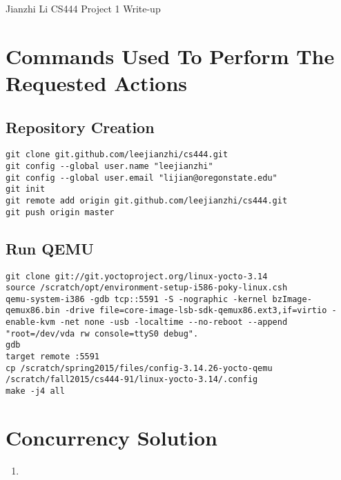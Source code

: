 \documentclass[letterpaper,11pt,titlepage]{article}
\begin{document}
Jianzhi Li\newline
CS444 Project 1 Write-up

\section{Commands Used To Perform The Requested Actions}


\subsection{Repository Creation}

\begin{lstlisting}
git clone git.github.com/leejianzhi/cs444.git
git config --global user.name "leejianzhi"
git config --global user.email "lijian@oregonstate.edu"
git init
git remote add origin git.github.com/leejianzhi/cs444.git
git push origin master
\end{lstlisting}


\subsection{Run QEMU}

\begin{lstlisting}
git clone git://git.yoctoproject.org/linux-yocto-3.14
source /scratch/opt/environment-setup-i586-poky-linux.csh
qemu-system-i386 -gdb tcp::5591 -S -nographic -kernel bzImage-qemux86.bin -drive file=core-image-lsb-sdk-qemux86.ext3,if=virtio -enable-kvm -net none -usb -localtime --no-reboot --append "root=/dev/vda rw console=ttyS0 debug".
gdb
target remote :5591
cp /scratch/spring2015/files/config-3.14.26-yocto-qemu /scratch/fall2015/cs444-91/linux-yocto-3.14/.config
make -j4 all
\end{lstlisting}

\section{Concurrency Solution}

\begin{enumerate}



\item 
\end{enumerate}
\end{document}
